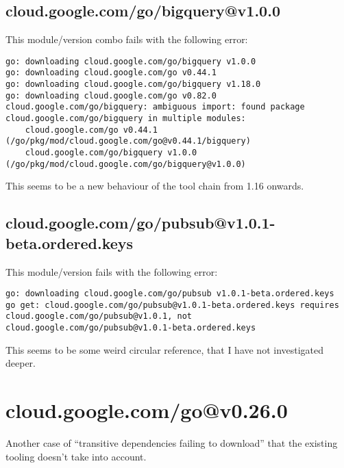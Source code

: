 \subsection{cloud.google.com/go/bigquery@v1.0.0}

This module/version combo fails with the following error:
\begin{verbatim}
go: downloading cloud.google.com/go/bigquery v1.0.0
go: downloading cloud.google.com/go v0.44.1
go: downloading cloud.google.com/go/bigquery v1.18.0
go: downloading cloud.google.com/go v0.82.0
cloud.google.com/go/bigquery: ambiguous import: found package cloud.google.com/go/bigquery in multiple modules:
	cloud.google.com/go v0.44.1 (/go/pkg/mod/cloud.google.com/go@v0.44.1/bigquery)
	cloud.google.com/go/bigquery v1.0.0 (/go/pkg/mod/cloud.google.com/go/bigquery@v1.0.0)
\end{verbatim}

This seems to be a new behaviour of the tool chain from 1.16 onwards.

\subsection{cloud.google.com/go/pubsub@v1.0.1-beta.ordered.keys}

This module/version fails with the following error:
\begin{verbatim}
go: downloading cloud.google.com/go/pubsub v1.0.1-beta.ordered.keys
go get: cloud.google.com/go/pubsub@v1.0.1-beta.ordered.keys requires cloud.google.com/go/pubsub@v1.0.1, not cloud.google.com/go/pubsub@v1.0.1-beta.ordered.keys
\end{verbatim}

This seems to be some weird circular reference, that I have not investigated deeper.

\section{cloud.google.com/go@v0.26.0}

Another case of ``transitive dependencies failing to download'' that the existing tooling doesn't take into account.

